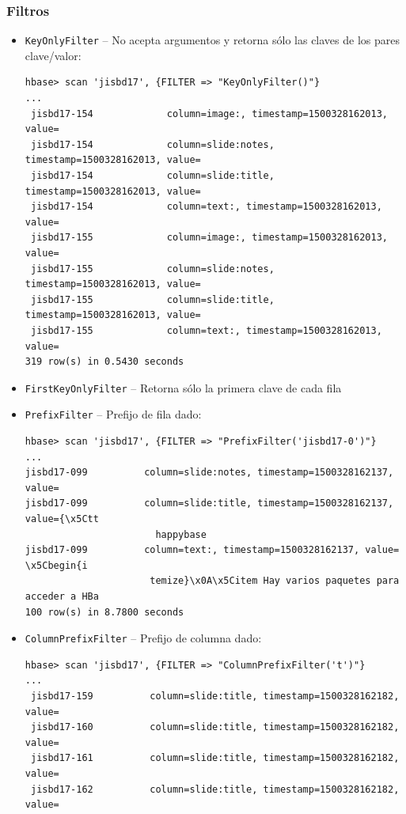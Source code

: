 \documentclass[14pt]{beamer}
\begin{document}
\begin{frame}
  \frametitle{Filtros}

  \begin{itemize}
  \item {\tt KeyOnlyFilter} -- No acepta argumentos y retorna sólo las
    claves de los pares clave/valor:

\lstset{basicstyle=\tiny\tt}

\begin{lstlisting}
hbase> scan 'jisbd17', {FILTER => "KeyOnlyFilter()"}
...
 jisbd17-154             column=image:, timestamp=1500328162013, value=
 jisbd17-154             column=slide:notes, timestamp=1500328162013, value=
 jisbd17-154             column=slide:title, timestamp=1500328162013, value=
 jisbd17-154             column=text:, timestamp=1500328162013, value=
 jisbd17-155             column=image:, timestamp=1500328162013, value=
 jisbd17-155             column=slide:notes, timestamp=1500328162013, value=
 jisbd17-155             column=slide:title, timestamp=1500328162013, value=
 jisbd17-155             column=text:, timestamp=1500328162013, value=
319 row(s) in 0.5430 seconds
\end{lstlisting}

\item {\tt FirstKeyOnlyFilter} -- Retorna sólo la primera clave de cada
  fila

  \framebreak

  \item {\tt PrefixFilter} -- Prefijo de fila dado:

    \begin{lstlisting}
hbase> scan 'jisbd17', {FILTER => "PrefixFilter('jisbd17-0')"}
...
jisbd17-099          column=slide:notes, timestamp=1500328162137, value=
jisbd17-099          column=slide:title, timestamp=1500328162137, value={\x5Ctt
                       happybase
jisbd17-099          column=text:, timestamp=1500328162137, value=  \x5Cbegin{i
                      temize}\x0A\x5Citem Hay varios paquetes para acceder a HBa
100 row(s) in 8.7800 seconds
\end{lstlisting}

  \item {\tt ColumnPrefixFilter} -- Prefijo de columna dado:

\begin{lstlisting}
hbase> scan 'jisbd17', {FILTER => "ColumnPrefixFilter('t')"}
...
 jisbd17-159          column=slide:title, timestamp=1500328162182, value=
 jisbd17-160          column=slide:title, timestamp=1500328162182, value=
 jisbd17-161          column=slide:title, timestamp=1500328162182, value=
 jisbd17-162          column=slide:title, timestamp=1500328162182, value=
\end{lstlisting}


\end{itemize}
\end{frame}
\end{document}
